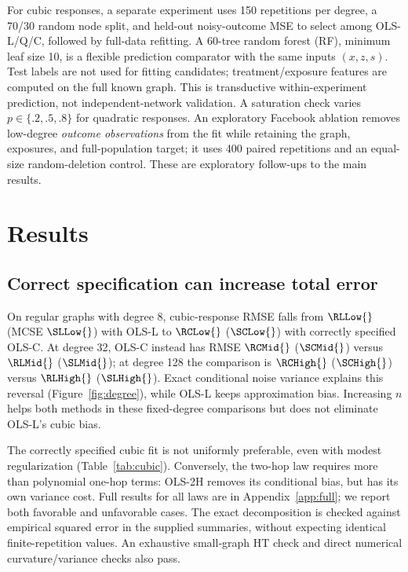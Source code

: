 \documentclass{article}
\begin{document}
For cubic responses, a separate experiment uses 150 repetitions per degree, a 70/30 random node split, and held-out noisy-outcome MSE to select among OLS-L/Q/C, followed by full-data refitting. A 60-tree random forest (RF), minimum leaf size 10, is a flexible prediction comparator with the same inputs $(x,z,s)$. Test labels are not used for fitting candidates; treatment/exposure features are computed on the full known graph. This is transductive within-experiment prediction, not independent-network validation. A saturation check varies $p\in\{.2,.5,.8\}$ for quadratic responses. An exploratory Facebook ablation removes low-degree \emph{outcome observations} from the fit while retaining the graph, exposures, and full-population target; it uses 400 paired repetitions and an equal-size random-deletion control. These are exploratory follow-ups to the main results.

\section{Results}
\subsection{Correct specification can increase total error}
On regular graphs with degree 8, cubic-response RMSE falls from $\RLLow{}$ (MCSE $\SLLow{}$) with OLS-L to $\RCLow{}$ ($\SCLow{}$) with correctly specified OLS-C. At degree 32, OLS-C instead has RMSE $\RCMid{}$ ($\SCMid{}$) versus $\RLMid{}$ ($\SLMid{}$); at degree 128 the comparison is $\RCHigh{}$ ($\SCHigh{}$) versus $\RLHigh{}$ ($\SLHigh{}$). Exact conditional noise variance explains this reversal (Figure~\ref{fig:degree}), while OLS-L keeps approximation bias. Increasing $n$ helps both methods in these fixed-degree comparisons but does not eliminate OLS-L's cubic bias.

The correctly specified cubic fit is not uniformly preferable, even with modest regularization (Table~\ref{tab:cubic}). Conversely, the two-hop law requires more than polynomial one-hop terms: OLS-2H removes its conditional bias, but has its own variance cost. Full results for all laws are in Appendix~\ref{app:full}; we report both favorable and unfavorable cases. The exact decomposition is checked against empirical squared error in the supplied summaries, without expecting identical finite-repetition values. An exhaustive small-graph HT check and direct numerical curvature/variance checks also pass.

\begin{table}[t]
\centering\scriptsize
\caption{Cubic-response GATE RMSE (Monte Carlo SE) over 400 repetitions per row. Bern.: independent Bernoulli assignment. Methods share outcomes within each row; assignment designs use independent draws. Full-exposure HT is reported separately because of unresolved rare-event tails.}
\label{tab:cubic}

\end{table}
\end{document}

